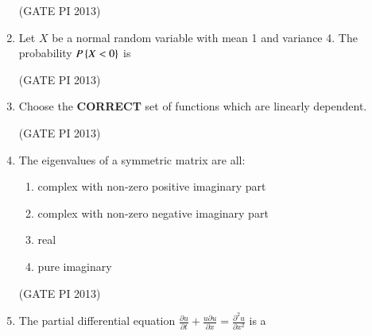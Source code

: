 \documentclass[journal,12pt,onecolumn]{IEEEtran}
\theoremstyle{remark}
\begin{document}
\begin{enumerate}
\hfill (GATE PI 2013)

\item Let $X$ be a normal random variable with mean 1 and variance 4. The probability $P\left\{X<0\right\}$ is 
\begin{enumerate}
\end{enumerate}

\hfill (GATE PI 2013)

\item Choose the \textbf{CORRECT} set of functions which are linearly dependent. 
\begin{enumerate}
\end{enumerate}

\hfill (GATE PI 2013)

\newpage
\item The eigenvalues of a symmetric matrix are all:
\begin{enumerate}
\item complex with non-zero positive imaginary part 
\item complex with non-zero negative imaginary part 
\item real
\item pure imaginary \\
\end{enumerate} 

\hfill (GATE PI 2013)

\item The partial differential equation 
$ \frac{\partial u}{\partial t} + \frac{u \partial u }{\partial x}=\frac{\partial^2 u}{\partial x^2} $
is a
\begin{enumerate}
\end{enumerate}


\end{enumerate}
\end{document}

